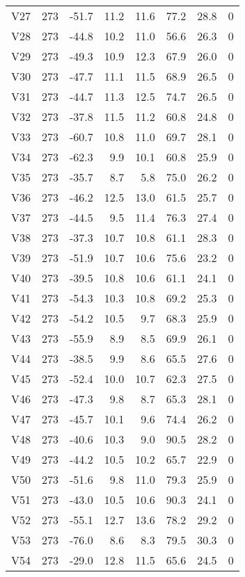 {\begin{longtable}{lrrrrrrr}
  V27 & 273 & -51.7 & 11.2 & 11.6 & 77.2 & 28.8 & 0 \\ 
  V28 & 273 & -44.8 & 10.2 & 11.0 & 56.6 & 26.3 & 0 \\ 
  V29 & 273 & -49.3 & 10.9 & 12.3 & 67.9 & 26.0 & 0 \\ 
  V30 & 273 & -47.7 & 11.1 & 11.5 & 68.9 & 26.5 & 0 \\ 
  V31 & 273 & -44.7 & 11.3 & 12.5 & 74.7 & 26.5 & 0 \\ 
  V32 & 273 & -37.8 & 11.5 & 11.2 & 60.8 & 24.8 & 0 \\ 
  V33 & 273 & -60.7 & 10.8 & 11.0 & 69.7 & 28.1 & 0 \\ 
  V34 & 273 & -62.3 &  9.9 & 10.1 & 60.8 & 25.9 & 0 \\ 
  V35 & 273 & -35.7 &  8.7 &  5.8 & 75.0 & 26.2 & 0 \\ 
  V36 & 273 & -46.2 & 12.5 & 13.0 & 61.5 & 25.7 & 0 \\ 
  V37 & 273 & -44.5 &  9.5 & 11.4 & 76.3 & 27.4 & 0 \\ 
  V38 & 273 & -37.3 & 10.7 & 10.8 & 61.1 & 28.3 & 0 \\ 
  V39 & 273 & -51.9 & 10.7 & 10.6 & 75.6 & 23.2 & 0 \\ 
  V40 & 273 & -39.5 & 10.8 & 10.6 & 61.1 & 24.1 & 0 \\ 
  V41 & 273 & -54.3 & 10.3 & 10.8 & 69.2 & 25.3 & 0 \\ 
  V42 & 273 & -54.2 & 10.5 &  9.7 & 68.3 & 25.9 & 0 \\ 
  V43 & 273 & -55.9 &  8.9 &  8.5 & 69.9 & 26.1 & 0 \\ 
  V44 & 273 & -38.5 &  9.9 &  8.6 & 65.5 & 27.6 & 0 \\ 
  V45 & 273 & -52.4 & 10.0 & 10.7 & 62.3 & 27.5 & 0 \\ 
  V46 & 273 & -47.3 &  9.8 &  8.7 & 65.3 & 28.1 & 0 \\ 
  V47 & 273 & -45.7 & 10.1 &  9.6 & 74.4 & 26.2 & 0 \\ 
  V48 & 273 & -40.6 & 10.3 &  9.0 & 90.5 & 28.2 & 0 \\ 
  V49 & 273 & -44.2 & 10.5 & 10.2 & 65.7 & 22.9 & 0 \\ 
  V50 & 273 & -51.6 &  9.8 & 11.0 & 79.3 & 25.9 & 0 \\ 
  V51 & 273 & -43.0 & 10.5 & 10.6 & 90.3 & 24.1 & 0 \\ 
  V52 & 273 & -55.1 & 12.7 & 13.6 & 78.2 & 29.2 & 0 \\ 
  V53 & 273 & -76.0 &  8.6 &  8.3 & 79.5 & 30.3 & 0 \\ 
  V54 & 273 & -29.0 & 12.8 & 11.5 & 65.6 & 24.5 & 0 \\ 

\end{longtable}}
